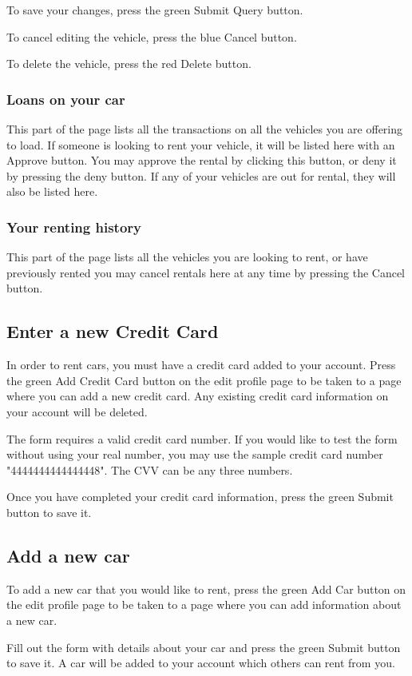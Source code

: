 \documentclass{article}
\begin{document}
To save your changes, press the green Submit Query button. 

To cancel editing the vehicle, press the blue Cancel button.

To delete the vehicle, press the red Delete button.

\subsubsection{Loans on your car}
This part of the page lists all the transactions on all the vehicles you are offering to load. If someone is looking to rent your vehicle, it will be listed here with an Approve button. You may approve the rental by clicking this button, or deny it by pressing the deny button. If any of your vehicles are out for rental, they will also be listed here.

\subsubsection{Your renting history}
This part of the page lists all the vehicles you are looking to rent, or have previously rented you may cancel rentals here at any time by pressing the Cancel button.

\subsection{Enter a new Credit Card}
In order to rent cars, you must have a credit card added to your account. Press the green Add Credit Card button on the edit profile page to be taken to a page where you can add a new credit card. Any existing credit card information on your account will be deleted.

The form requires a valid credit card number. If you would like to test the form without using your real number, you may use the sample credit card number "4444444444444448". The CVV can be any three numbers.

Once you have completed your credit card information, press the green Submit button to save it.

\subsection{Add a new car}
To add a new car that you would like to rent, press the green Add Car button on the edit profile page to be taken to a page where you can add information about a new car.

Fill out the form with details about your car and press the green Submit button to save it. A car will be added to your account which others can rent from you.
\end{document}
